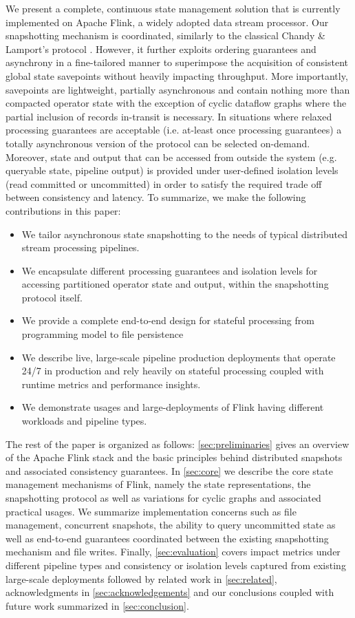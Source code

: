We present a complete, continuous state management solution that is currently implemented on Apache Flink, a widely adopted data stream processor. Our snapshotting mechanism is coordinated, similarly to the classical Chandy \& Lamport's protocol \cite{chandy1985distributed}. However, it further exploits ordering guarantees and asynchrony in a fine-tailored manner to superimpose the acquisition of consistent global state savepoints without heavily impacting throughput. More importantly, savepoints are lightweight, partially asynchronous and contain nothing more than compacted operator state with the exception of cyclic dataflow graphs where the partial inclusion of records in-transit is necessary. In situations where relaxed processing guarantees are acceptable (i.e. at-least once processing guarantees) a totally asynchronous version of the protocol can be selected on-demand. Moreover, state and output that can be accessed from outside the system (e.g. queryable state, pipeline output) is provided under user-defined isolation levels (read committed or uncommitted) in order to satisfy the required trade off between consistency and latency. To summarize, we make the following contributions in this paper: 

\begin{itemize}
	\item We tailor asynchronous state snapshotting to the needs of typical distributed stream processing pipelines.
	\item We encapsulate different processing guarantees and isolation levels for accessing partitioned operator state and output, within the snapshotting protocol itself.
	\item We provide a complete end-to-end design for stateful processing from programming model to file persistence
	\item We describe live, large-scale pipeline production deployments that operate 24/7 in production and rely heavily on stateful processing coupled with runtime metrics and performance insights.
	\item We demonstrate usages and large-deployments of Flink having different workloads and pipeline types.
\end{itemize}

The rest of the paper is organized as follows: \autoref{sec:preliminaries} gives an overview of the Apache Flink stack and the basic principles behind distributed snapshots and associated consistency guarantees. In \autoref{sec:core} we describe the core state management mechanisms of Flink, namely the state representations, the snapshotting protocol as well as variations for cyclic graphs and associated practical usages. We summarize implementation concerns such as file management, concurrent snapshots, the ability to query uncommitted state as well as end-to-end guarantees coordinated between the existing snapshotting mechanism and file writes. Finally, \autoref{sec:evaluation} covers impact metrics under different pipeline types and consistency or isolation levels captured from existing large-scale deployments followed by related work in \autoref{sec:related}, acknowledgments in \autoref{sec:acknowledgements} and our conclusions coupled with future work summarized in \autoref{sec:conclusion}.
